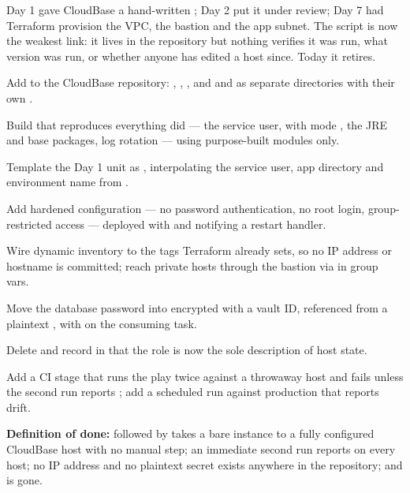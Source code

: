 
Day 1 gave CloudBase a hand-written ; Day 2 put it under review; Day 7 had Terraform provision the VPC, the bastion and the app subnet. The script is now the weakest link: it lives in the repository but nothing verifies it was run, what version was run, or whether anyone has edited a host since. Today it retires.

\begin{buildalong}
\begin{wbitem}
  \item Add  to the CloudBase repository: , , , and  and  as separate directories with their own .
  \item Build  that reproduces everything  did --- the  service user,  with mode , the JRE and base packages, log rotation --- using purpose-built modules only.
  \item Template the Day 1  unit as , interpolating the service user, app directory and environment name from .
  \item Add hardened  configuration --- no password authentication, no root login, group-restricted access --- deployed with  and notifying a restart handler.
  \item Wire dynamic inventory to the tags Terraform already sets, so no IP address or hostname is committed; reach private hosts through the bastion via  in group vars.
  \item Move the database password into  encrypted with a  vault ID, referenced from a plaintext , with  on the consuming task.
  \item Delete  and record in  that the role is now the sole description of host state.
  \item Add a CI stage that runs the play twice against a throwaway host and fails unless the second run reports ; add a scheduled  run against production that reports drift.
\end{wbitem}
\smallskip\textbf{Definition of done:}  followed by  takes a bare instance to a fully configured CloudBase host with no manual step; an immediate second run reports  on every host; no IP address and no plaintext secret exists anywhere in the repository; and  is gone.
\end{buildalong}

